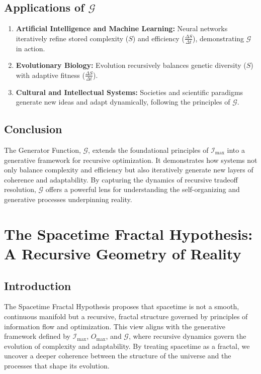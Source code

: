 \documentclass[12pt]{article}
\begin{document}
\subsection{Applications of \(\mathcal{G}\)}
\begin{enumerate}
    \item \textbf{Artificial Intelligence and Machine Learning:}
    Neural networks iteratively refine stored complexity (\(S\)) and efficiency (\(\frac{\Delta S}{\Delta t}\)), demonstrating \(\mathcal{G}\) in action.
    \item \textbf{Evolutionary Biology:}
    Evolution recursively balances genetic diversity (\(S\)) with adaptive fitness (\(\frac{\Delta S}{\Delta t}\)).
    \item \textbf{Cultural and Intellectual Systems:}
    Societies and scientific paradigms generate new ideas and adapt dynamically, following the principles of \(\mathcal{G}\).
\end{enumerate}

\subsection{Conclusion}
The Generator Function, \(\mathcal{G}\), extends the foundational principles of \(\mathcal{I}_{\text{max}}\) into a generative framework for recursive optimization. It demonstrates how systems not only balance complexity and efficiency but also iteratively generate new layers of coherence and adaptability. By capturing the dynamics of recursive tradeoff resolution, \(\mathcal{G}\) offers a powerful lens for understanding the self-organizing and generative processes underpinning reality.


\section{The Spacetime Fractal Hypothesis: A Recursive Geometry of Reality}

\subsection{Introduction}
The Spacetime Fractal Hypothesis proposes that spacetime is not a smooth, continuous manifold but a recursive, fractal structure governed by principles of information flow and optimization. This view aligns with the generative framework defined by \(\mathcal{I}_{\text{max}}\), \(O_{\text{max}}\), and \(\mathcal{G}\), where recursive dynamics govern the evolution of complexity and adaptability. By treating spacetime as a fractal, we uncover a deeper coherence between the structure of the universe and the processes that shape its evolution.
\end{document}

